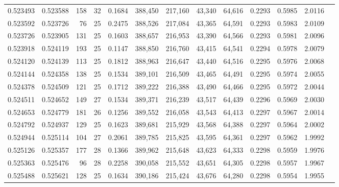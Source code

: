 \begin{tabular}{rrrrrrrrrrrrr}
0.523493 & 0.523588 &   158 &  32 &                                     0.1684 & 388,450 & 217,160 &  43,340 &  64,616 & 0.2293 & 0.5985 & 2.0116 \\
0.523592 & 0.523726 &    76 &  25 &                                     0.2475 & 388,526 & 217,084 &  43,365 &  64,591 & 0.2293 & 0.5983 & 2.0109 \\
0.523726 & 0.523905 &   131 &  25 &                                     0.1603 & 388,657 & 216,953 &  43,390 &  64,566 & 0.2293 & 0.5981 & 2.0096 \\
0.523918 & 0.524119 &   193 &  25 &                                     0.1147 & 388,850 & 216,760 &  43,415 &  64,541 & 0.2294 & 0.5978 & 2.0079 \\
0.524120 & 0.524139 &   113 &  25 &                                     0.1812 & 388,963 & 216,647 &  43,440 &  64,516 & 0.2295 & 0.5976 & 2.0068 \\
0.524144 & 0.524358 &   138 &  25 &                                     0.1534 & 389,101 & 216,509 &  43,465 &  64,491 & 0.2295 & 0.5974 & 2.0055 \\
0.524378 & 0.524509 &   121 &  25 &                                     0.1712 & 389,222 & 216,388 &  43,490 &  64,466 & 0.2295 & 0.5972 & 2.0044 \\
0.524511 & 0.524652 &   149 &  27 &                                     0.1534 & 389,371 & 216,239 &  43,517 &  64,439 & 0.2296 & 0.5969 & 2.0030 \\
0.524653 & 0.524779 &   181 &  26 &                                     0.1256 & 389,552 & 216,058 &  43,543 &  64,413 & 0.2297 & 0.5967 & 2.0014 \\
0.524792 & 0.524937 &   129 &  25 &                                     0.1623 & 389,681 & 215,929 &  43,568 &  64,388 & 0.2297 & 0.5964 & 2.0002 \\
0.524944 & 0.525114 &   104 &  27 &                                     0.2061 & 389,785 & 215,825 &  43,595 &  64,361 & 0.2297 & 0.5962 & 1.9992 \\
0.525126 & 0.525357 &   177 &  28 &                                     0.1366 & 389,962 & 215,648 &  43,623 &  64,333 & 0.2298 & 0.5959 & 1.9976 \\
0.525363 & 0.525476 &    96 &  28 &                                     0.2258 & 390,058 & 215,552 &  43,651 &  64,305 & 0.2298 & 0.5957 & 1.9967 \\
0.525488 & 0.525621 &   128 &  25 &                                     0.1634 & 390,186 & 215,424 &  43,676 &  64,280 & 0.2298 & 0.5954 & 1.9955 \\

\end{tabular}
